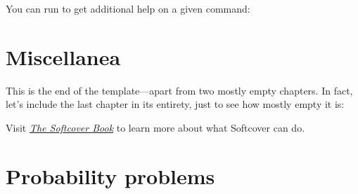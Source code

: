\noindent You can run  to get additional help on a given command:


\section{Miscellanea}

This is the end of the template---apart from two mostly empty chapters. In fact, let’s include the last chapter in its entirety, just to see how mostly empty it is:

Visit \href{http://manual.softcover.io}{\emph{The Softcover Book}} to learn more about what Softcover can do.




\section{Probability problems}

